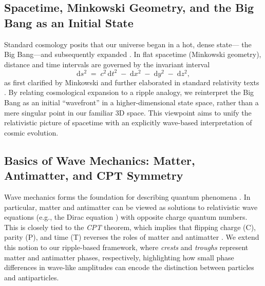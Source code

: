 \documentclass{article}
\begin{document}
\subsection{Spacetime, Minkowski Geometry, and the Big Bang as an Initial State}
\label{subsec:spacetime-bigbang}
Standard cosmology posits that our universe began in a hot, dense state---%
the Big Bang---and subsequently expanded \cite{hawking1988, penrose2004}. 
In flat spacetime (Minkowski geometry), distance and time intervals are 
governed by the invariant interval
\[
  \mathrm{d}s^2 \;=\; c^2 \,\mathrm{d}t^2 \;-\;\mathrm{d}x^2 \;-\;\mathrm{d}y^2 \;-\;\mathrm{d}z^2,
\]
as first clarified by Minkowski \cite{minkowski1908space} and further 
elaborated in standard relativity texts \cite{rindler1977essential, misner1973}. 
By relating cosmological expansion to a ripple analogy, we reinterpret 
the Big Bang as an initial ``wavefront'' in a higher-dimensional state space, 
rather than a mere singular point in our familiar 3D space. This viewpoint 
aims to unify the relativistic picture of spacetime with an explicitly 
wave-based interpretation of cosmic evolution.

\subsection{Basics of Wave Mechanics: Matter, Antimatter, and CPT Symmetry}
\label{subsec:wave-mechanics}
Wave mechanics forms the foundation for describing quantum phenomena 
\cite{griffiths2005introduction, feynmanlectures}. In particular, matter 
and antimatter can be viewed as solutions to relativistic wave equations 
(e.g., the Dirac equation \cite{Dirac1928}) with opposite charge quantum 
numbers. This is closely tied to the \emph{CPT} theorem, which implies 
that flipping charge (C), parity (P), and time (T) reverses the roles 
of matter and antimatter \cite{rindler1977essential}. We extend this 
notion to our ripple-based framework, where \emph{crests} and 
\emph{troughs} represent matter and antimatter phases, respectively, 
highlighting how small phase differences in wave-like amplitudes can 
encode the distinction between particles and antiparticles.
\end{document}
